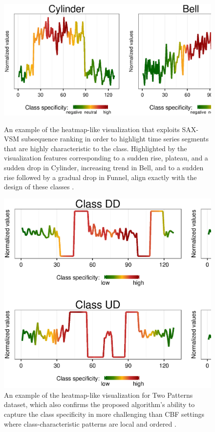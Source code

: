 \begin{figure}[!h]
   \centering
   \includegraphics[width=130mm]{figures/cbf-heatmap.ps}
   \caption[An example of the heatmap-like visualization that exploits SAX-VSM subsequence ranking in order to 
   highlight time series segments that are highly characteristic to the class.]{An example of the heatmap-like visualization that exploits SAX-VSM subsequence ranking in order to 
   highlight time series segments that are highly characteristic to the class.
   Highlighted by the visualization features corresponding to a sudden rise, plateau, and a sudden drop in Cylinder, 
   increasing trend in Bell,
   and to a sudden rise followed by a gradual drop in Funnel, 
   align exactly with the design of these classes \cite{cbf}.}
   \label{fig:heat1}
   \includegraphics[width=130mm]{figures/2patterns-heatmap.ps}
   \caption[An example of the heatmap-like visualization for Two Patterns dataset.]{An example of the heatmap-like visualization for Two Patterns dataset, which also confirms the proposed 
   algorithm's ability to capture the class specificity in more challenging than CBF settings where class-characteristic 
   patterns are local and ordered \cite{two_patterns}.}
   \label{fig:heat2}
\end{figure}

